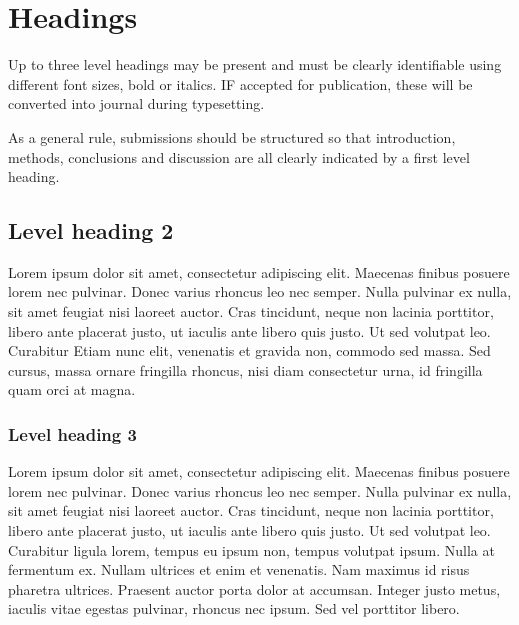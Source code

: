 \section{Headings}\label{sec:headings}

Up to three level headings may be present and must be clearly identifiable
using different font sizes, bold or italics. IF accepted for publication,
these will be converted into journal during typesetting.

As a general rule, submissions should be structured so that introduction,
methods, conclusions and discussion are all clearly indicated by a first level heading.

\subsection{Level heading 2}
Lorem ipsum dolor sit amet, consectetur adipiscing elit. 
Maecenas finibus posuere lorem nec pulvinar. Donec varius 
rhoncus leo nec semper. Nulla pulvinar ex nulla, sit amet feugiat
nisi laoreet auctor. Cras tincidunt, neque non lacinia porttitor, 
libero ante placerat justo, ut iaculis ante libero quis justo.
Ut sed volutpat leo. Curabitur 
Etiam nunc elit, venenatis et gravida non, commodo sed massa.
Sed cursus, massa ornare fringilla rhoncus, nisi diam consectetur urna,
id fringilla quam orci at magna.

\subsubsection{Level heading 3}

Lorem ipsum dolor sit amet, consectetur adipiscing elit. 
Maecenas finibus posuere lorem nec pulvinar. Donec varius rhoncus leo 
nec semper. Nulla pulvinar ex nulla, sit amet feugiat nisi laoreet auctor.
Cras tincidunt, neque non lacinia porttitor, libero ante placerat justo,
ut iaculis ante libero quis justo. Ut sed volutpat leo. Curabitur ligula
lorem, tempus eu ipsum non, tempus volutpat ipsum. Nulla at fermentum ex.
Nullam ultrices et enim et venenatis. Nam maximus id risus pharetra ultrices. 
Praesent auctor porta dolor at accumsan. 
Integer justo metus, iaculis vitae egestas pulvinar, rhoncus nec ipsum. 
Sed vel porttitor libero.